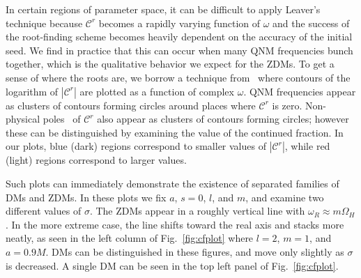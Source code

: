\begin{refsection}
In certain regions of parameter space, it can be difficult to apply Leaver's technique because $\mathcal C^r$ becomes a rapidly varying function of $\omega$ and the success of the root-finding scheme becomes heavily dependent on the accuracy of the initial seed. 
We find in practice that this can occur when many QNM frequencies bunch together, which is the qualitative behavior we expect for the ZDMs. To get a sense of where the roots are, we borrow a technique from~\cite{Yang:2012pj} where contours of the logarithm of $|\mathcal C^r|$ are plotted as a function of complex $\omega$. 
QNM frequencies appear as clusters of contours forming circles around places where $\mathcal C^r$ is zero. 
Non-physical poles~\cite{LeaverPoles} of $\mathcal C^r$ also appear as clusters of contours forming circles; however these can be distinguished by examining the value of the continued fraction. 
In our plots, blue (dark) regions correspond to smaller values of $|\mathcal C^r|$, while red (light) regions correspond to  larger values. 

Such plots can immediately demonstrate the existence of separated families of DMs and ZDMs. In these plots we fix $a$, $s=0$, $l$, and $m$, and examine two different values of $\sigma$. The ZDMs appear in a roughly vertical line with $\omega_R \approx m \Omega_H$. In the more extreme case, the line shifts toward the real axis and stacks more neatly, as seen in the left column of Fig.~\ref{fig:cfplot} where $l=2$, $m=1$, and $a = 0.9 M$. DMs can be distinguished in these figures, and move only slightly as $\sigma$ is decreased. A single DM can be seen in the top left panel of Fig.~\ref{fig:cfplot}.


\end{refsection}
